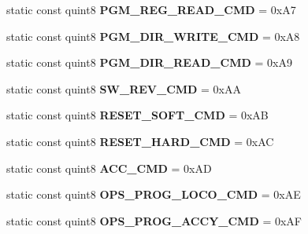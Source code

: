 \begin{DoxyCompactItemize}
\item 
\mbox{\label{class_n_c_e_message_a52b03a0b475a58e4e2b93632cee45cf6}} 
static const quint8 {\bfseries P\+G\+M\+\_\+\+R\+E\+G\+\_\+\+R\+E\+A\+D\+\_\+\+C\+MD} = 0x\+A7
\item 
\mbox{\label{class_n_c_e_message_afb8794c356aef459e263c2bbc44ba58d}} 
static const quint8 {\bfseries P\+G\+M\+\_\+\+D\+I\+R\+\_\+\+W\+R\+I\+T\+E\+\_\+\+C\+MD} = 0x\+A8
\item 
\mbox{\label{class_n_c_e_message_aab21f0c057cfe98b4d1879b7a7e286bb}} 
static const quint8 {\bfseries P\+G\+M\+\_\+\+D\+I\+R\+\_\+\+R\+E\+A\+D\+\_\+\+C\+MD} = 0x\+A9
\item 
\mbox{\label{class_n_c_e_message_af50c51c7592d83b8e2c4e19449b4ebf3}} 
static const quint8 {\bfseries S\+W\+\_\+\+R\+E\+V\+\_\+\+C\+MD} = 0x\+AA
\item 
\mbox{\label{class_n_c_e_message_a0c8f36e762ccfa9642c564a2df7d4dfd}} 
static const quint8 {\bfseries R\+E\+S\+E\+T\+\_\+\+S\+O\+F\+T\+\_\+\+C\+MD} = 0x\+AB
\item 
\mbox{\label{class_n_c_e_message_ac8b7f7c524044cf3ad89fd93f7318a14}} 
static const quint8 {\bfseries R\+E\+S\+E\+T\+\_\+\+H\+A\+R\+D\+\_\+\+C\+MD} = 0x\+AC
\item 
\mbox{\label{class_n_c_e_message_a3babcd798c5a276e7154e087480af584}} 
static const quint8 {\bfseries A\+C\+C\+\_\+\+C\+MD} = 0x\+AD
\item 
\mbox{\label{class_n_c_e_message_abb560a81f2bf0fa2810ffa4acb98d12c}} 
static const quint8 {\bfseries O\+P\+S\+\_\+\+P\+R\+O\+G\+\_\+\+L\+O\+C\+O\+\_\+\+C\+MD} = 0x\+AE
\item 
\mbox{\label{class_n_c_e_message_a67cd90c3490e7cf82de4333c7d195f94}} 
static const quint8 {\bfseries O\+P\+S\+\_\+\+P\+R\+O\+G\+\_\+\+A\+C\+C\+Y\+\_\+\+C\+MD} = 0x\+AF
\item 
\mbox{\label{class_n_c_e_message_af412792e9f0d444c1132a569c899cd41}} 

\end{DoxyCompactItemize}
